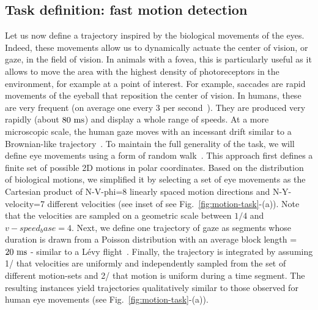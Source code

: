 \documentclass[default]{sn-jnl}%
\theoremstyle{thmstyleone}%
\theoremstyle{thmstyletwo}%
\theoremstyle{thmstylethree}%
\newcommand{\seeFig}[1]{see Fig.~\ref{fig:#1}}%
\begin{document}
\subsection{Task definition: fast motion detection}
Let us now define a trajectory inspired by the biological movements of the eyes. Indeed, these movements allow us to dynamically actuate the center of vision, or gaze, in the field of vision. In animals with a fovea, this is particularly useful as it allows to move the area with the highest density of photoreceptors in the environment, for example at a point of interest. For example, saccades are rapid movements of the eyeball that reposition the center of vision. In humans, these are very frequent (on average one every 3 per second~\citep{dandekar_neural_2012}). They are produced very rapidly (about $80~\si{\milli\second}$) and display a whole range of speeds. At a more microscopic scale, the human gaze moves with an incessant drift similar to a Brownian-like trajectory~\citep{poletti_head-eye_2015}. To maintain the full generality of the task, we will define eye movements using a form of random walk~\citep{engbert_integrated_2011}. This approach first defines a finite set of possible 2D motions in polar coordinates. Based on the distribution of biological motions, we simplified it by selecting a set of eye movements as the Cartesian product of N-V-phi=8 linearly spaced motion directions and N-Y-velocity=7 different velocities (see inset of \seeFig{motion-task}-(a)). Note that the velocities are sampled on a geometric scale between $1/4$ and $v-speed_base = 4$. Next, we define one trajectory of gaze as segments whose duration is drawn from a Poisson distribution with an average block length = $20~\si{\milli\second}$ - similar to a Lévy flight~\citep{}. Finally, the trajectory is integrated by assuming 1/ that velocities are uniformly and independently sampled from the set of different motion-sets and 2/ that motion is uniform during a time segment. The resulting instances yield trajectories qualitatively similar to those observed for human eye movements (\seeFig{motion-task}-(a)).
\end{document}
